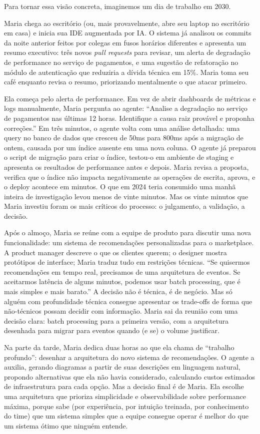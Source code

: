 Para tornar essa visão concreta, imaginemos um dia de trabalho em 2030.

Maria chega ao escritório (ou, mais provavelmente, abre seu laptop
no escritório em casa) e inicia sua IDE augmentada por IA. O sistema
já analisou os commits da noite anterior feitos por colegas em fusos
horários diferentes e apresenta um resumo executivo: três novos
\textit{pull requests} para revisar, um alerta de degradação de
performance no serviço de pagamentos, e uma sugestão de refatoração no
módulo de autenticação que reduziria a dívida técnica em 15\%. Maria
toma seu café enquanto revisa o resumo, priorizando mentalmente o que
atacar primeiro.

Ela começa pelo alerta de performance. Em vez de abrir dashboards de
métricas e logs manualmente, Maria pergunta ao agente: ``Analise a
degradação no serviço de pagamentos nas últimas 12 horas. Identifique
a causa raiz provável e proponha correções.'' Em três minutos, o agente
volta com uma análise detalhada: uma query no banco de dados que cresceu
de 50ms para 800ms após a migração de ontem, causada por um índice
ausente em uma nova coluna. O agente já preparou o script de migração
para criar o índice, testou-o em ambiente de staging e apresenta os
resultados de performance antes e depois. Maria revisa a proposta,
verifica que o índice não impacta negativamente as operações de escrita,
aprova, e o deploy acontece em minutos. O que em 2024 teria consumido
uma manhã inteira de investigação levou menos de vinte minutos. Mas
os vinte minutos que Maria investiu foram os mais críticos do processo:
o julgamento, a validação, a decisão.

Após o almoço, Maria se reúne com a equipe de produto para discutir uma
nova funcionalidade: um sistema de recomendações personalizadas para o
marketplace. A product manager descreve o que os clientes querem; o
designer mostra protótipos de interface; Maria traduz tudo em restrições
técnicas. ``Se quisermos recomendações em tempo real, precisamos de uma
arquitetura de eventos. Se aceitarmos latência de alguns minutos, podemos
usar batch processing, que é mais simples e mais barato.'' A decisão não
é técnica, é de negócio. Mas só alguém com profundidade técnica
consegue apresentar os trade-offs de forma que não-técnicos possam
decidir com informação. Maria sai da reunião com uma decisão clara:
batch processing para a primeira versão, com a arquitetura desenhada
para migrar para eventos quando (e se) o volume justificar.

Na parte da tarde, Maria dedica duas horas ao que ela chama de ``trabalho
profundo'': desenhar a arquitetura do novo sistema de recomendações.
O agente a auxilia, gerando diagramas a partir de suas descrições em
linguagem natural, propondo alternativas que ela não havia considerado,
calculando custos estimados de infraestrutura para cada opção. Mas a
decisão final é de Maria. Ela escolhe uma arquitetura que prioriza
simplicidade e observabilidade sobre performance máxima, porque sabe
(por experiência, por intuição treinada, por conhecimento do time) que
um sistema simples que a equipe consegue operar é melhor do que um
sistema ótimo que ninguém entende.

